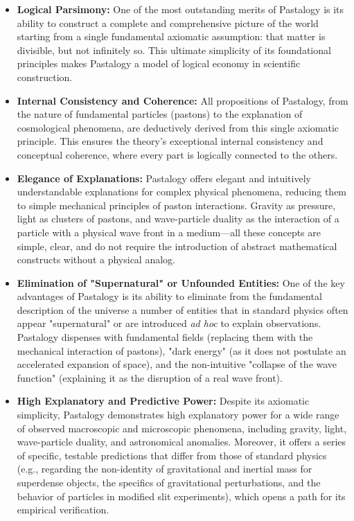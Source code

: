 \documentclass[pdflatex,sn-mathphys-num,referee]{sn-jnl}
\begin{document}
\begin{itemize}
    \item \textbf{Logical Parsimony:} One of the most outstanding merits of Pastalogy is its ability to construct a complete and comprehensive picture of the world starting from a single fundamental axiomatic assumption: that matter is divisible, but not infinitely so. This ultimate simplicity of its foundational principles makes Pastalogy a model of logical economy in scientific construction.
    
    \item \textbf{Internal Consistency and Coherence:} All propositions of Pastalogy, from the nature of fundamental particles (pastons) to the explanation of cosmological phenomena, are deductively derived from this single axiomatic principle. This ensures the theory's exceptional internal consistency and conceptual coherence, where every part is logically connected to the others.
    
    \item \textbf{Elegance of Explanations:} Pastalogy offers elegant and intuitively understandable explanations for complex physical phenomena, reducing them to simple mechanical principles of paston interactions. Gravity as pressure, light as clusters of pastons, and wave-particle duality as the interaction of a particle with a physical wave front in a medium---all these concepts are simple, clear, and do not require the introduction of abstract mathematical constructs without a physical analog.
    
    \item \textbf{Elimination of "Supernatural" or Unfounded Entities:} One of the key advantages of Pastalogy is its ability to eliminate from the fundamental description of the universe a number of entities that in standard physics often appear "supernatural" or are introduced \textit{ad hoc} to explain observations. Pastalogy dispenses with fundamental fields (replacing them with the mechanical interaction of pastons), "dark energy" (as it does not postulate an accelerated expansion of space), and the non-intuitive "collapse of the wave function" (explaining it as the disruption of a real wave front).
    
    \item \textbf{High Explanatory and Predictive Power:} Despite its axiomatic simplicity, Pastalogy demonstrates high explanatory power for a wide range of observed macroscopic and microscopic phenomena, including gravity, light, wave-particle duality, and astronomical anomalies. Moreover, it offers a series of specific, testable predictions that differ from those of standard physics (e.g., regarding the non-identity of gravitational and inertial mass for superdense objects, the specifics of gravitational perturbations, and the behavior of particles in modified slit experiments), which opens a path for its empirical verification.
\end{itemize}
\end{document}
